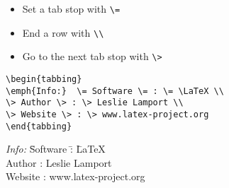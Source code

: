 \documentclass{article}
\begin{document}
\begin{itemize}
  \item Set a tab stop with \verb!\=!
  \item End a row with \verb!\\!
  \item Go to the next tab stop with \verb!\>!
\end{itemize}

\begin{verbatim}
\begin{tabbing}
\emph{Info:}  \= Software \= : \= \LaTeX \\
\> Author \> : \> Leslie Lamport \\
\> Website \> : \> www.latex-project.org
\end{tabbing}
\end{verbatim}


\begin{tabbing}
\emph{Info:}  \= Software \= : \= \LaTeX \\
\> Author \> : \> Leslie Lamport \\
\> Website \> : \> www.latex-project.org
\end{tabbing}
\end{document}
